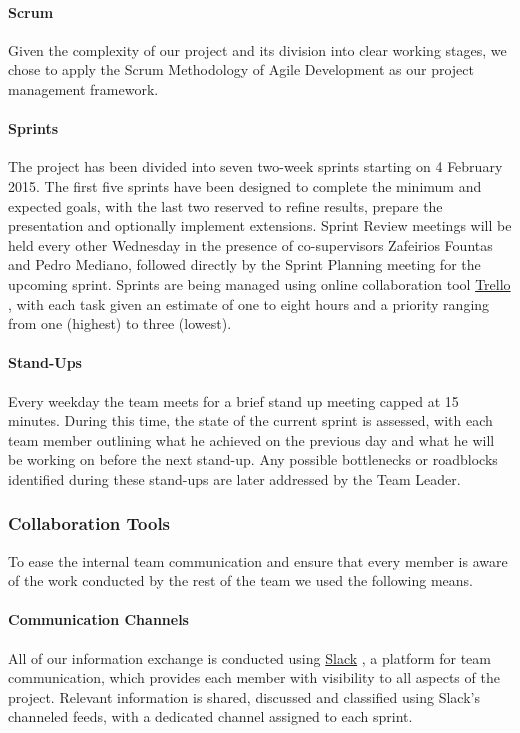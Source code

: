 \documentclass[a4paper,11pt]{article}
\begin{document}
\paragraph{Scrum}

Given the complexity of our project and its division into clear working stages, we chose to apply the Scrum Methodology of Agile Development as our project management framework.

\paragraph{Sprints}
The project has been divided into seven two-week sprints starting on 4 February 2015. The first five sprints have been designed to complete the minimum and expected goals, with the last two reserved to refine results, prepare the presentation and optionally implement extensions. Sprint Review meetings will be held every other Wednesday in the presence of co-supervisors Zafeirios Fountas and Pedro Mediano, followed directly by the Sprint Planning meeting for the upcoming sprint. Sprints are being managed using online collaboration tool \href{http://trello.com}{Trello} \cite{trello}, with each task given an estimate of one to eight hours and a priority ranging from one (highest) to three (lowest).

\paragraph{Stand-Ups}
Every weekday the team meets for a brief stand up meeting capped at 15 minutes. During this time, the state of the current sprint is assessed, with each team member outlining what he achieved on the previous day and what he will be working on before the next stand-up. Any possible bottlenecks or roadblocks identified during these stand-ups are later addressed by the Team Leader.

\subsubsection{Collaboration Tools}
To ease the internal team communication and ensure that every member is aware of the work conducted by the rest of the team we used the following means.

\paragraph{Communication Channels}
All of our information exchange is conducted using \href{http://slack.com}{Slack} \cite{slack}, a platform for team communication, which provides each member with visibility to all aspects of the project. Relevant information is shared, discussed and classified using Slack's channeled feeds, with a dedicated channel assigned to each sprint.
\end{document}
